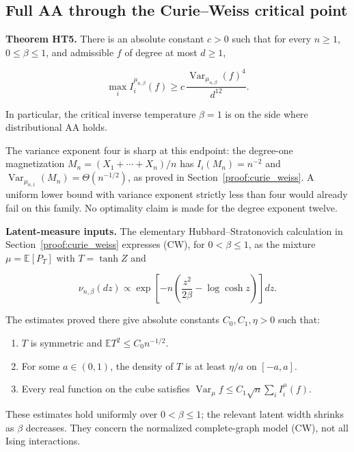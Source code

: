\subsection{Full AA through the Curie--Weiss critical point}\label{ht:full-aa-through-the-curieweiss-critical-point}

\textbf{Theorem HT5.} There is an absolute constant \(c>0\) such that for every \(n\ge 1\), \(0\le \beta\le 1\), and admissible \(f\) of degree at most \(d\ge 1\),

\[
\boxed{\qquad
\max_i I_i^{\mu_{n,\beta}}(f)
\ge c\,\frac{\operatorname{Var}_{\mu_{n,\beta}}(f)^4}{d^{12}}.
\qquad}
\tag{HT5}
\]

In particular, the critical inverse temperature \(\beta=1\) is on the side where distributional AA holds.

The variance exponent four is sharp at this endpoint: the degree-one magnetization \(M_n=(X_1+\cdots +X_n)/n\) has \(I_i(M_n)=n^{-2}\) and \(\operatorname{Var}_{\mu_{n,1}}(M_n)=\Theta(n^{-1/2})\), as proved in Section~\ref{proof:curie_weiss}. A uniform lower bound with variance exponent strictly less than four would already fail on this family. No optimality claim is made for the degree exponent twelve.

\textbf{Latent-measure inputs.} The elementary Hubbard--Stratonovich calculation in Section~\ref{proof:curie_weiss} expresses (CW), for \(0<\beta\le 1\), as the mixture \(\mu=\mathbb E[P_T]\) with \(T=\tanh Z\) and

\[
\nu_{n,\beta}(dz)
\propto \exp\left[-n\left(\frac{z^2}{2\beta}-\log\cosh z\right)\right]dz.
\]

The estimates proved there give absolute constants \(C_0,C_1,\eta>0\) such that:

\begin{enumerate}
\def\labelenumi{\arabic{enumi}.}
\tightlist
\item
  \(T\) is symmetric and \(\mathbb E T^2\le C_0 n^{-1/2}\).
\item
  For some \(a \in (0,1)\), the density of \(T\) is at least \(\eta/a\) on \([-a,a]\).
\item
  Every real function on the cube satisfies \(\operatorname{Var}_\mu f \le  C_1 \sqrt{n} \sum_i I_i^\mu(f)\).
\end{enumerate}

These estimates hold uniformly over \(0<\beta\le 1\); the relevant latent width shrinks as \(\beta\) decreases. They concern the normalized complete-graph model (CW), not all Ising interactions.

